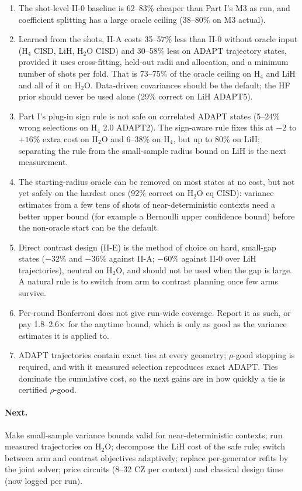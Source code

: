 \documentclass[10.5pt]{article}
\begin{document}
\begin{enumerate}
  \item The shot-level II-0 baseline is 62--83\% cheaper than Part I's M3 as run, and coefficient splitting has a large oracle ceiling (38--80\% on M3 actual).
  \item Learned from the shots, II-A costs 35--57\% less than II-0 without oracle input (H$_4$ CISD, LiH, H$_2$O CISD) and 30--58\% less on ADAPT trajectory states, provided it uses cross-fitting, held-out radii and allocation, and a minimum number of shots per fold. That is 73--75\% of the oracle ceiling on H$_4$ and LiH and all of it on H$_2$O. Data-driven covariances should be the default; the HF prior should never be used alone (29\% correct on LiH ADAPT5).
  \item Part I's plug-in sign rule is not safe on correlated ADAPT states (5--24\% wrong selections on H$_4$ 2.0 ADAPT2). The sign-aware rule fixes this at $-2$ to $+16\%$ extra cost on H$_2$O and 6--38\% on H$_4$, but up to 80\% on LiH; separating the rule from the small-sample radius bound on LiH is the next measurement.
  \item The starting-radius oracle can be removed on most states at no cost, but not yet safely on the hardest ones (92\% correct on H$_2$O eq CISD): variance estimates from a few tens of shots of near-deterministic contexts need a better upper bound (for example a Bernoulli upper confidence bound) before the non-oracle start can be the default.
  \item Direct contrast design (II-E) is the method of choice on hard, small-gap states ($-32\%$ and $-36\%$ against II-A; $-60\%$ against II-0 over LiH trajectories), neutral on H$_2$O, and should not be used when the gap is large. A natural rule is to switch from arm to contrast planning once few arms survive.
  \item Per-round Bonferroni does not give run-wide coverage. Report it as such, or pay 1.8--2.6$\times$ for the anytime bound, which is only as good as the variance estimates it is applied to.
  \item ADAPT trajectories contain exact ties at every geometry; $\rho$-good stopping is required, and with it measured selection reproduces exact ADAPT. Ties dominate the cumulative cost, so the next gains are in how quickly a tie is certified $\rho$-good.
\end{enumerate}

\paragraph{Next.}
Make small-sample variance bounds valid for near-deterministic contexts; run measured trajectories on H$_2$O; decompose the LiH cost of the safe rule; switch between arm and contrast objectives adaptively; replace per-generator refits by the joint solver; price circuits (8--32 CZ per context) and classical design time (now logged per run).
\end{document}
